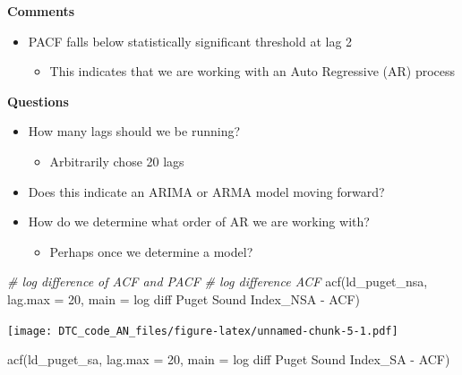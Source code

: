 \documentclass[
]{article}
\newenvironment{Shaded}{\begin{snugshade}}{\end{snugshade}}
\newcommand{\AttributeTok}[1]{\textcolor[rgb]{0.77,0.63,0.00}{#1}}
\newcommand{\CommentTok}[1]{\textcolor[rgb]{0.56,0.35,0.01}{\textit{#1}}}
\newcommand{\DecValTok}[1]{\textcolor[rgb]{0.00,0.00,0.81}{#1}}
\newcommand{\FunctionTok}[1]{\textcolor[rgb]{0.00,0.00,0.00}{#1}}
\newcommand{\NormalTok}[1]{#1}
\newcommand{\StringTok}[1]{\textcolor[rgb]{0.31,0.60,0.02}{#1}}
\providecommand{\tightlist}{%
  \setlength{\itemsep}{0pt}\setlength{\parskip}{0pt}}
\begin{document}
\textbf{Comments}

\begin{itemize}
\item
  PACF falls below statistically significant threshold at lag 2

  \begin{itemize}
  \tightlist
  \item
    This indicates that we are working with an Auto Regressive (AR)
    process
  \end{itemize}
\end{itemize}

\textbf{Questions}

\begin{itemize}
\item
  How many lags should we be running?

  \begin{itemize}
  \tightlist
  \item
    Arbitrarily chose 20 lags
  \end{itemize}
\item
  Does this indicate an ARIMA or ARMA model moving forward?
\item
  How do we determine what order of AR we are working with?

  \begin{itemize}
  \tightlist
  \item
    Perhaps once we determine a model?
  \end{itemize}
\end{itemize}

\begin{Shaded}
\begin{Highlighting}[]
\CommentTok{\# log difference of ACF and PACF}
\CommentTok{\# log difference ACF}
\FunctionTok{acf}\NormalTok{(ld\_puget\_nsa, }\AttributeTok{lag.max =} \DecValTok{20}\NormalTok{, }\AttributeTok{main =} \StringTok{\textquotesingle{}log diff Puget Sound Index\_NSA {-} ACF\textquotesingle{}}\NormalTok{)}
\end{Highlighting}
\end{Shaded}

\texttt{[image: DTC\_code\_AN\_files/figure-latex/unnamed-chunk-5-1.pdf]}

\begin{Shaded}
\begin{Highlighting}[]
\FunctionTok{acf}\NormalTok{(ld\_puget\_sa, }\AttributeTok{lag.max =} \DecValTok{20}\NormalTok{, }\AttributeTok{main =} \StringTok{\textquotesingle{}log diff Puget Sound Index\_SA {-} ACF\textquotesingle{}}\NormalTok{)}
\end{Highlighting}
\end{Shaded}
\end{document}
